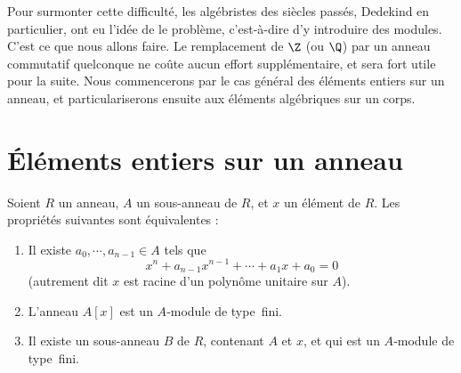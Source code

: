 \documentclass[11pt, %
  title in boldface,
  theorem in new line,
  theorem numbering = section,
  number theorems separately,
  simple name,
]{beaulivre}
\begin{document}
Pour surmonter cette difficulté, les algébristes des siècles passés, Dedekind en particulier, ont eu l'idée de  le problème, c'est-à-dire d'y introduire des modules. C'est ce que nous allons faire. Le remplacement de \( \Z \) (ou \( \Q \)) par un anneau commutatif quelconque ne coûte aucun effort supplémentaire, et sera fort utile pour la suite. Nous commencerons par le cas général des éléments entiers sur un anneau, et particulariserons ensuite aux éléments algébriques sur un corps.

\section{Éléments entiers sur un anneau}

    \begin{theorem}\label{thm:conditions d'être entier}
        Soient \( R \) un anneau, \( A \) un sous-anneau de \( R \), et \( x \) un élément de \( R \). Les propriétés suivantes sont équivalentes :
        \begin{enumerate}
            \item \label{thm:conditions d'être entier;item1} Il existe \( a_0, \cdots, a_{n-1} \in A \) tels que
            \begin{equation}
                x^n + a_{n-1} x^{n-1} + \cdots + a_1 x + a_0 = 0
            \end{equation}
            (autrement dit \( x \) est racine d'un polynôme unitaire sur \( A \)).
            \item \label{thm:conditions d'être entier;item2} L'anneau \( A[x] \) est un \( A \)‑module de type~fini.
            \item \label{thm:conditions d'être entier;item3} Il existe un sous-anneau \( B \) de \( R \), contenant \( A \) et \( x \), et qui est un \( A \)‑module de type~fini.
        \end{enumerate}
    \end{theorem}
\end{document}
